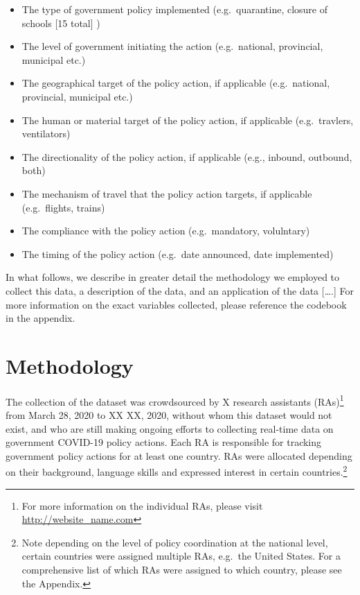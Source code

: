 \documentclass[
]{article}
\providecommand{\tightlist}{%
  \setlength{\itemsep}{0pt}\setlength{\parskip}{0pt}}
\begin{document}
\begin{itemize}
\tightlist
\item
  The type of government policy implemented (e.g.~quarantine, closure of schools {[}15 total{]} )
\item
  The level of government initiating the action (e.g.~national, provincial, municipal etc.)
\item
  The geographical target of the policy action, if applicable (e.g.~national, provincial, municipal etc.)
\item
  The human or material target of the policy action, if applicable (e.g.~travlers, ventilators)
\item
  The directionality of the policy action, if applicable (e.g., inbound, outbound, both)
\item
  The mechanism of travel that the policy action targets, if applicable (e.g.~flights, trains)
\item
  The compliance with the policy action (e.g.~mandatory, volulntary)
\item
  The timing of the policy action (e.g.~date announced, date implemented)
\end{itemize}

In what follows, we describe in greater detail the methodology we employed to collect this data, a description of the data, and an application of the data {[}\ldots.{]} For more information on the exact variables collected, please reference the codebook in the appendix.

\hypertarget{methodology}{%
\section{Methodology}\label{methodology}}

The collection of the dataset was crowdsourced by X research assistants (RAs)\footnote{For more information on the individual RAs, please visit \url{http://website_name.com} } from March 28, 2020 to XX XX, 2020, without whom this dataset would not exist, and who are still making ongoing efforts to collecting real-time data on government COVID-19 policy actions. Each RA is responsible for tracking government policy actions for at least one country. RAs were allocated depending on their background, language skills and expressed interest in certain countries.\footnote{Note depending on the level of policy coordination at the national level, certain countries were assigned multiple RAs, e.g.~the United States. For a comprehensive list of which RAs were assigned to which country, please see the Appendix.}
\end{document}
